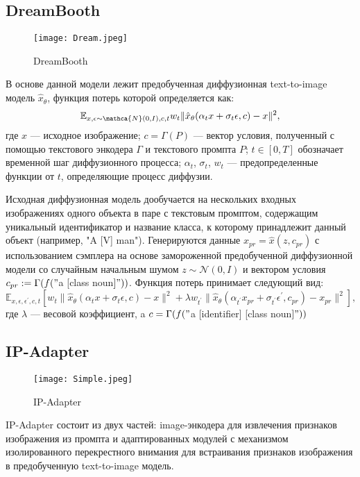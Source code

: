 \documentclass{article}
\begin{document}
\subsection{DreamBooth}

\begin{figure}[H]
    \centering
    \texttt{[image: Dream.jpeg]}
    \caption{DreamBooth}
    \label{fig:simple}
\end{figure}

В основе данной модели лежит предобученная диффузионная text-to-image модель $\hat{x}_{\theta}$, функция потерь которой определяется как: $$\mathbb{E}_{x, \epsilon \sim \mathca{N}(0, I), c, t} w_t \|\hat{x}_{\theta}(\alpha_t x + \sigma_t \epsilon, c) - x\|^2,$$ где $x$ --- исходное изображение; $c = \Gamma(P)$ --- вектор условия, полученный с помощью текстового энкодера $\Gamma$ и текстового промпта $P$; $t \in [0, T]$ обозначает временной шаг диффузионного процесса; $\alpha_t$, $\sigma_t$, $w_t$ --- предопределенные функции от $t$, определяющие процесс диффузии. 

Исходная диффузионная модель дообучается на нескольких входных изображениях одного объекта в паре с текстовым промптом, содержащим уникальный идентификатор и название класса, к которому принадлежит данный объект (например, "A [V] man"). Генерируются данные $x_{pr} = \hat{x}(z, c_{pr})$ с использованием сэмплера на основе замороженной предобученной диффузионной модели со случайным начальным шумом $z \sim \mathcal{N}(0, I)$ и вектором условия $c_{pr} := \Gamma(f("$a [class  noun$]"))$. Функция потерь принимает следующий вид: $$\mathbb{E}_{x, \epsilon, \epsilon^{\prime}, c, t} [w_t \|\hat{x}_{\theta}(\alpha_t x + \sigma_t \epsilon, c) - x\|^2 + \lambda w_{t^{\prime}} \|\hat{x}_{\theta}(\alpha_{t^{\prime}} x_{pr} + \sigma_{t^{\prime}} \epsilon^{\prime}, c_{pr}) - x_{pr}\|^2],$$ где $\lambda$ --- весовой коэффициент, a $c = \Gamma(f("$a [identifier] [class noun$]"))$



\subsection{IP-Adapter}

\begin{figure}[H]
    \centering
    \texttt{[image: Simple.jpeg]}
    \caption{IP-Adapter}
    \label{fig:simple}
\end{figure}

IP-Adapter состоит из двух частей: image-энкодера для извлечения признаков изображения из промпта и адаптированных модулей с механизмом изолированного перекрестного внимания для встраивания признаков изображения в предобученную text-to-image модель.
\end{document}
